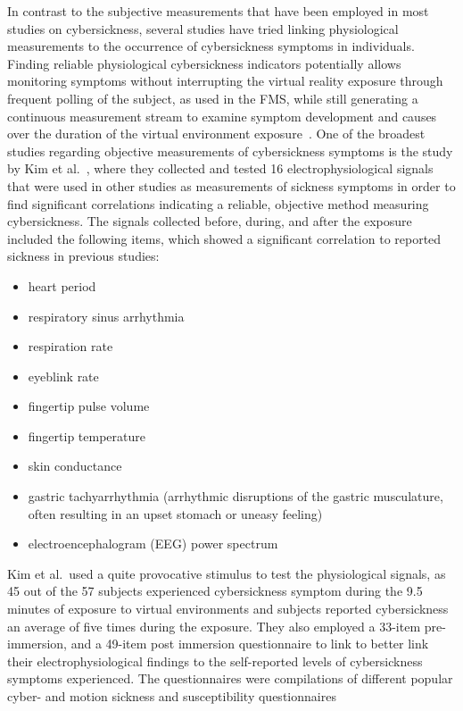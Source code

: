 In contrast to the subjective measurements that have been employed in most studies on cybersickness, several studies
have tried linking physiological measurements to the occurrence of cybersickness symptoms in individuals.
Finding reliable physiological cybersickness indicators potentially allows monitoring symptoms without interrupting
the virtual reality exposure through frequent polling of the subject, as used in the FMS, while still generating a
continuous measurement stream to examine symptom development and causes over the duration of the virtual environment
exposure~\cite{Rebenitsch2016}.
One of the broadest studies regarding objective measurements of cybersickness symptoms is the study by
Kim et al.~\cite{Kim2005}, where they collected and tested 16 electrophysiological signals that were used in other
studies as measurements of sickness symptoms in order to find significant correlations indicating a reliable,
objective method measuring cybersickness.
The signals collected before, during, and after the exposure included the following items, which showed a significant
correlation to reported sickness in previous studies:
\begin{itemize}
    \item heart period
    \item respiratory sinus arrhythmia
    \item respiration rate
    \item eyeblink rate
    \item fingertip pulse volume
    \item fingertip temperature
    \item skin conductance
    \item gastric tachyarrhythmia (arrhythmic disruptions of the gastric musculature, often resulting in an upset
    stomach or uneasy feeling)
    \item electroencephalogram (EEG) power spectrum
\end{itemize}
Kim et al.\ used a quite provocative stimulus to test the physiological signals, as 45 out of the 57 subjects
experienced cybersickness symptom during the 9.5 minutes of exposure to virtual environments and subjects reported
cybersickness an average of five times during the exposure.
They also employed a 33-item pre-immersion, and a 49-item post immersion questionnaire to link to better link their
electrophysiological findings to the self-reported levels of cybersickness symptoms experienced.
The questionnaires were compilations of different popular cyber- and motion sickness and susceptibility questionnaires
